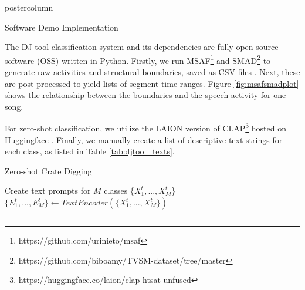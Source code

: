 \documentclass{beamer}
\begin{document}
\begin{frame}
\begin{columns}
\begin{column}{.43\textwidth}
\begin{beamercolorbox}[center]{postercolumn}
\begin{minipage}{.98\textwidth}
{%
					\begin{myblock}{Software Demo Implementation}
					
					The DJ-tool classification system and its dependencies are fully open-source software (OSS) written in Python. Firstly, we run MSAF\footnote{https://github.com/urinieto/msaf} and SMAD\footnote{https://github.com/biboamy/TVSM-dataset/tree/master} to generate raw activities and structural boundaries, saved as CSV files \cite{Hung2022, nieto2016systematic}. Next, these are post-processed to yield lists of segment time ranges. Figure \ref{fig:msafsmadplot} shows the relationship between the boundaries and the speech activity for one song. 
					
					\vspace{1.2em}
					For zero-shot classification, we utilize the LAION version of CLAP\footnote{https://huggingface.co/laion/clap-htsat-unfused} hosted on Huggingface \cite{elizalde2022claplearningaudioconcepts, WuClap2023}. Finally, we manually create a list of descriptive text strings for each class, as listed in Table \ref{tab:djtool_texts}.
					\vspace{1.2em}

			 \begin{algorithm}[H]
			 \vspace{0.2em}
			    \caption{Zero-shot Crate Digging}\label{combo_algo}
			    	Create text prompts for $M$ classes \{$X^{t}_{1},...,X^{t}_{M}$\} \\
			    	 $\{E^{t}_{1},...,E^{t}_{M}\} \gets TextEncoder(\{X^{t}_{1},...,X^{t}_{M}\})$ \\
					\BlankLine
			 \end{algorithm}
			\vspace{0.4em}
		  \end{myblock}\vfill
		}\end{minipage}\end{beamercolorbox}
	\end{column}
	

\end{columns}
\end{frame}
\end{document}

